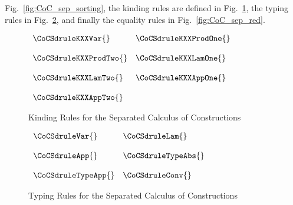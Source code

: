 Fig.~\ref{fig:CoC_sep_sorting}, the kinding rules are defined in
Fig.~\ref{fig:CoC_sep_kinding}, the typing rules in
Fig.~\ref{fig:CoC_sep_typing}, and finally the equality rules in
Fig.~\ref{fig:CoC_sep_red}.
\begin{figure}
  \begin{center}
    \begin{math}
      \begin{array}{lll}
        \CoCSdruleKXXVar{} & \CoCSdruleKXXProdOne{}\\
        &\\
        \CoCSdruleKXXProdTwo{} & \CoCSdruleKXXLamOne{}\\
        &\\
        \CoCSdruleKXXLamTwo{} & \CoCSdruleKXXAppOne{}\\
        &\\
        \CoCSdruleKXXAppTwo{}
      \end{array}
    \end{math}
  \end{center}
  \caption{Kinding Rules for the Separated Calculus of Constructions}
  \label{fig:CoC_sep_kinding}
\end{figure}
\begin{figure}
  \begin{center}
    \begin{math}
      \begin{array}{lll}
        \CoCSdruleVar{} & \CoCSdruleLam{}\\
        &\\
        \CoCSdruleApp{} & \CoCSdruleTypeAbs{}\\
        &\\
        \CoCSdruleTypeApp{} & \CoCSdruleConv{}
      \end{array}
    \end{math}
  \end{center}
  \caption{Typing Rules for the Separated Calculus of Constructions}
  \label{fig:CoC_sep_typing}
\end{figure}
